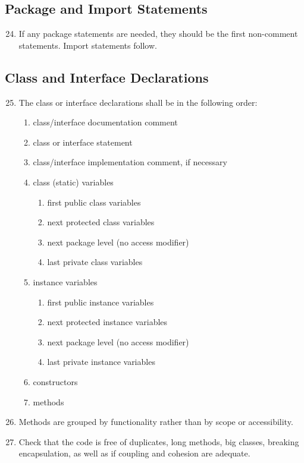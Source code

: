 	\subsection{Package and Import Statements}
	\begin{enumerate}
		\setcounter{enumi}{23}
		\item If any package statements are needed, they should be the first non-comment statements. Import statements follow.
	\end{enumerate}
	\subsection{Class and Interface Declarations}
	\begin{enumerate}
		\setcounter{enumi}{24}
		\item The class or interface declarations shall be in the following order:
		\begin{enumerate}
			\item class/interface documentation comment
			\item class or interface statement
			\item class/interface implementation comment, if necessary
			\item class (static) variables
			\begin{enumerate}
				\item first public class variables
				\item next protected class variables
				\item next package level (no access modifier)
				\item last private class variables
			\end{enumerate}
			\item instance variables
			\begin{enumerate}
				\item first public instance variables
				\item next protected instance variables
				\item next package level (no access modifier)
				\item last private instance variables
			\end{enumerate}
			\item constructors
			\item methods
		\end{enumerate}
		\item Methods are grouped by functionality rather than by scope or accessibility.
		\item Check that the code is free of duplicates, long methods, big classes, breaking encapsulation, as well as if coupling and cohesion are adequate.
	\end{enumerate}
